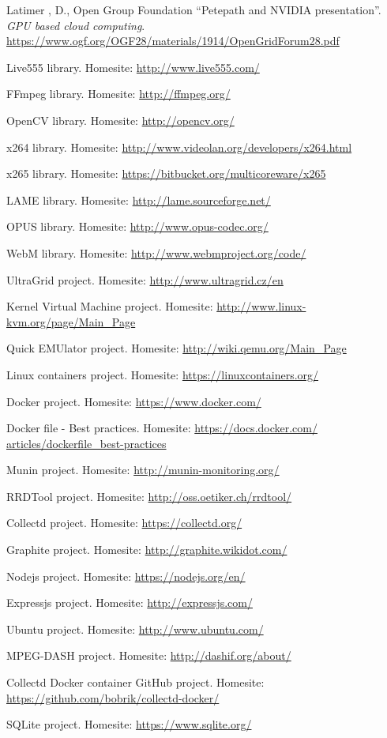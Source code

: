 \documentclass[english,final]{setup/eetac_tfc_pfc}
\begin{document}
\begin{thebibliography}{2}
Latimer , D., Open Group Foundation
``Petepath and NVIDIA presentation''. {\it GPU based cloud computing}.
\url{https://www.ogf.org/OGF28/materials/1914/OpenGridForum28.pdf}

Live555 library. Homesite: \url{http://www.live555.com/}

FFmpeg library. Homesite: \url{http://ffmpeg.org/}

OpenCV library. Homesite: \url{http://opencv.org/}

x264 library. Homesite: \url{http://www.videolan.org/developers/x264.html}

x265 library. Homesite: \url{https://bitbucket.org/multicoreware/x265}

LAME library. Homesite: \url{http://lame.sourceforge.net/}

OPUS library. Homesite: \url{http://www.opus-codec.org/}

WebM library. Homesite: \url{http://www.webmproject.org/code/}

UltraGrid project. Homesite: \url{http://www.ultragrid.cz/en}

Kernel Virtual Machine project. Homesite: \url{http://www.linux-kvm.org/page/Main_Page}

Quick EMUlator project. Homesite: \url{http://wiki.qemu.org/Main_Page}

Linux containers project. Homesite: \url{https://linuxcontainers.org/}

Docker project. Homesite: \url{https://www.docker.com/}

Docker file - Best practices. Homesite: \url{https://docs.docker.com/
articles/dockerfile_best-practices}

Munin project. Homesite: \url{http://munin-monitoring.org/}

RRDTool project. Homesite: \url{http://oss.oetiker.ch/rrdtool/}

Collectd project. Homesite: \url{https://collectd.org/}

Graphite project. Homesite: \url{http://graphite.wikidot.com/}

Nodejs project. Homesite: \url{https://nodejs.org/en/}

Expressjs project. Homesite: \url{http://expressjs.com/}

Ubuntu project. Homesite: \url{http://www.ubuntu.com/}

MPEG-DASH project. Homesite: \url{http://dashif.org/about/}

Collectd Docker container GitHub project. Homesite: \url{https://github.com/bobrik/collectd-docker/}

SQLite project. Homesite: \url{https://www.sqlite.org/}



\end{thebibliography}
\end{document}
